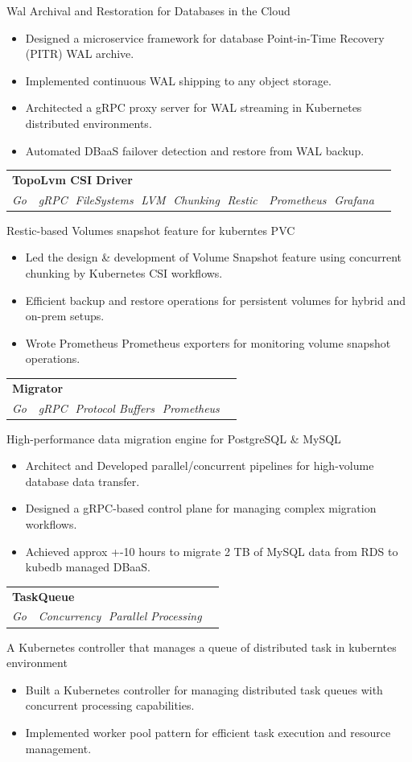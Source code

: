 \documentclass[letterpaper,11pt]{article}
\makeatletter
\newcommand{\resumeItem}[1]{
  \item\small{
    {#1 \vspace{-1pt}}
  }
}
\newcommand{\resumeSubheading}[4]{
  \vspace{-2pt}\item
    \begin{tabular*}{1.0\textwidth}[t]{l@{\extracolsep{\fill}}r}
      \textbf{\large#1} & \textbf{\small #2} \\
      \textit{\large#3} & \textit{\small #4} \\
    \end{tabular*}\vspace{-7pt}
}
\newcommand{\resumeItemListStart}{\begin{itemize}[leftmargin=0.1in]}
\newcommand{\resumeItemListEnd}{\end{itemize}\vspace{-5pt}}
\makeatother
\begin{document}
       {Wal Archival and Restoration for Databases in the Cloud}{}
      \resumeItemListStart
          \resumeItem{\normalsize{Designed a microservice framework for database Point-in-Time Recovery (PITR) WAL archive.}}
          \resumeItem{\normalsize{Implemented continuous WAL shipping to any object storage.}}
          \resumeItem{\normalsize{Architected a gRPC proxy server for WAL streaming in Kubernetes distributed environments.}}
          \resumeItem{\normalsize{Automated DBaaS failover detection and restore from WAL backup.}}
      \resumeItemListEnd  

       \resumeSubheading
       {TopoLvm CSI Driver \href{https://github.com/cloudnativestorage/topolvm}{\faGithub}}{}
       {\small Go \,\textbullet\, \small gRPC \,\textbullet\,\small FileSystems \,\textbullet\,\small LVM \,\textbullet\,\small Chunking \,\textbullet\,\small Restic \,\textbullet\, \small Prometheus \,\textbullet\,\small Grafana}{}      

       {Restic-based Volumes snapshot feature for kuberntes PVC}{}
      \resumeItemListStart
          \resumeItem{\normalsize{Led the design \& development of Volume Snapshot feature using concurrent chunking by Kubernetes CSI workflows.}}
          \resumeItem{\normalsize{Efficient backup and restore operations for persistent volumes for hybrid and on-prem setups.}}
          \resumeItem{\normalsize{Wrote Prometheus Prometheus exporters for monitoring volume snapshot operations.}}
      \resumeItemListEnd  

    \resumeSubheading
       {Migrator}{}
       {\small Go \,\textbullet\, \small gRPC \,\textbullet\,\small Protocol Buffers \,\textbullet\,\small Prometheus}{}      

       {High-performance data migration engine for PostgreSQL \& MySQL}{}
      \resumeItemListStart
          \resumeItem{\normalsize{Architect and Developed parallel/concurrent pipelines for high-volume database data transfer.}}
          \resumeItem{\normalsize{Designed a gRPC-based control plane for managing complex migration workflows.}}
          \resumeItem{\normalsize{Achieved approx +-10 hours to migrate 2 TB of MySQL data from RDS to kubedb managed DBaaS.}}
      \resumeItemListEnd  

    \resumeSubheading
       {TaskQueue \href{https://github.com/kubeops/taskqueue}{\faGithub}}{}
       {\small Go \,\textbullet\, \small Concurrency \,\textbullet\,\small Parallel Processing}{}    
       
       {A Kubernetes controller that manages a queue of distributed task in kuberntes environment}{}
      \resumeItemListStart
          \resumeItem{\normalsize{Built a Kubernetes controller for managing distributed task queues with concurrent processing capabilities.}}
          \resumeItem{\normalsize{Implemented worker pool pattern for efficient task execution and resource management.}}
      \resumeItemListEnd
\end{document}

